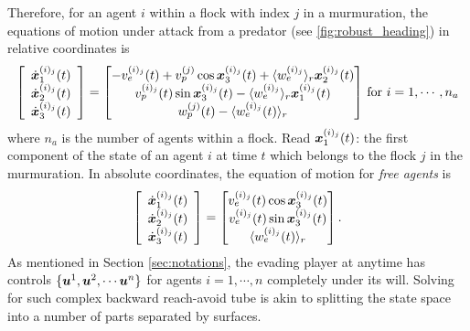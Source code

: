 Therefore, for an agent $i$ within a flock with index $j$ in a murmuration, the equations of motion under attack from a predator (see \autoref{fig:robust_heading}) in relative coordinates is %
%
\begin{align}
\left[\begin{array}{c}
\dot{\state}_1^{(i)_j}(t) \\ \dot{\state}_2^{(i)_j} (t) \\ \dot{\state}_3^{(i)_j} (t)
\end{array}\right] = \begin{bmatrix}
-v_e^{(i)_j}(t) + v_p^{(j)} \cos \state_3^{(i)_j}(t) + \langle w_e^{(i)_j} \rangle_r \state_2^{(i)_j}(t)
%
\\
v_p^{(i)_j}(t)\sin \state_3^{(i)_j}(t) - \langle w_e^{(i)_j} \rangle_r \state_1^{(i)_j}(t)
\\ 
w_p^{(j)}(t) - \langle w_e^{(i)_j}(t) \rangle_r
\end{bmatrix} \, \text{for } i=1,\cdots, n_a
\end{align}
%
where $n_a$ is the number of agents within a flock. Read ${\bm{x}}_1^{(i)_j}(t)$: the first component of the state of an agent $i$ at time $t$ which belongs to the flock $j$ in the murmuration. In absolute coordinates, the equation of motion for \textit{free agents} is 
%
\begin{align}\left[\begin{array}{c}
		\dot{\bm{x}}_1^{(i)_j}(t) \\ \dot{\bm{x}}_2^{(i)_j} (t) \\ \dot{\bm{x}}_3^{(i)_j} (t)
	\end{array}\right] = \begin{bmatrix}
		v_e^{(i)_j}(t) \cos \bm{x}_3^{(i)_j}(t) 
		\\
		v_e^{(i)_j}(t)\sin \bm{x}_3^{(i)_j}(t) 
		\\ 
		\langle w_e^{(i)_j}(t) \rangle_r
	\end{bmatrix}.
\end{align}
%
As mentioned in Section \ref{sec:notations}, the evading player at anytime has controls $\{\bm{u}^1, \bm{u}^2, \cdots \bm{u}^n\}$ for agents $i=1, \cdots, n$ completely  under its will. Solving for such complex backward reach-avoid tube is akin to splitting the state space into a number of parts separated by surfaces.  


